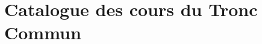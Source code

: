 \documentclass[french,11pt]{article}
\begin{document}
\newpage
\section{Catalogue des cours du Tronc Commun}
\setlength{\itemsep}{0pt}\small
\newcommand{\courstitle}[1]{\subsection{#1}}
\newpage
\newpage
\newpage
\newpage
\newpage
\newpage
\end{document}
